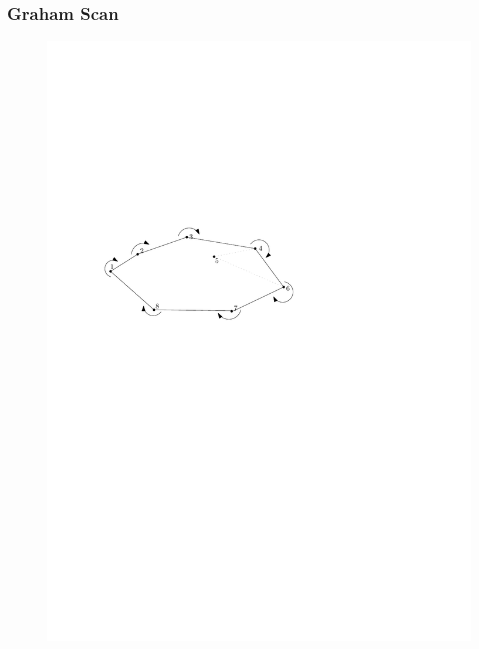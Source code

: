 \begin{frame}
	\frametitle{{Graham Scan}}
\begin{figure}[htbp]
	\begin{center}
  	\includegraphics[width=.8\linewidth]{bilder/scan3}
	\end{center}
\end{figure}
\end{frame}

